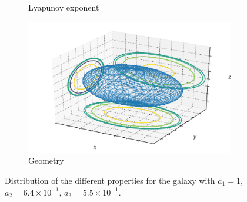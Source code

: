 \begin{figure}[h]
\begin{subfigure}[t]{0.4\textwidth}
        \caption{Lyapunov exponent}
    \end{subfigure}
    \begin{subfigure}[t]{0.4\textwidth}
        \includegraphics[width=\textwidth]{"../Files/Week 13/images/2_ellipsoid"}
        \caption{Geometry}
    \end{subfigure}
    \caption{Distribution of the different properties for the galaxy with $a_1 = 1$, $a_2 = 6.4\times10^{-1}$, $a_3 = 5.5\times10^{-1}$.}
    \label{fig: g15}
\end{figure}


